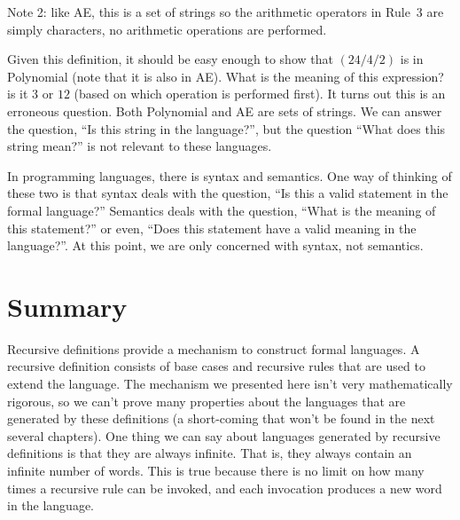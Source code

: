 \documentclass[letterpaper,12pt,openany,reqno]{book}%
\begin{document}
Note 2: like AE, this is a set of strings so the arithmetic operators in Rule~3 are simply characters, no arithmetic operations are performed. 

Given this definition, it should be easy enough to show that $(24/4/2)$ is in Polynomial (note that it is also in AE). What is the meaning of this expression? is it $3$ or $12$ (based on which operation is performed first). It turns out this is an erroneous question. Both Polynomial and AE are sets of strings. We can answer the question, ``Is this string in the language?'', but the question ``What does this string mean?'' is not relevant to these languages.

In programming languages, there is syntax and semantics. One way of thinking of these two is that syntax deals with the question, ``Is this a valid statement in the formal language?'' Semantics deals with the question, ``What is the meaning of this statement?'' or even, ``Does this statement have a valid meaning in the language?''. At this point, we are only concerned with syntax, not semantics.

\section{Summary}
Recursive definitions provide a mechanism to construct formal languages. A recursive definition consists of base cases and recursive rules that are used to extend the language. The mechanism we presented here isn't very mathematically rigorous, so we can't prove many properties about the languages that are generated by these definitions (a short-coming that won't be found in the next several chapters). One thing we can say about languages generated by recursive definitions is that they are always infinite. That is, they always contain an infinite number of words. This is true because there is no limit on how many times a recursive rule can be invoked, and each invocation produces a new word in the language.
\end{document}

